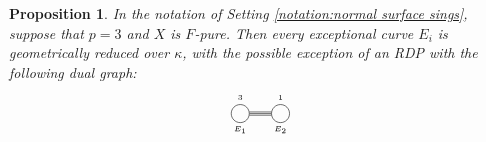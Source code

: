 \documentclass[12pt]{amsart}
\theoremstyle{plain}
\newtheorem{prop}[thm]{Proposition}
\theoremstyle{definition}
\theoremstyle{remark}
\newtheorem{defn and notation}[thm]{Definition and Notation}
\theoremstyle{plain}
\numberwithin{equation}{thm}
\begin{document}
\begin{prop}\label{prop:geom red,p=3,SFP}
    In the notation of Setting \ref{notation:normal surface sings}, suppose that $p=3$ and $X$ is $F$-pure.
    Then every exceptional curve $E_i$ is geometrically reduced over $\kappa$, with the possible exception of an RDP with the following dual graph:
\[
\begin{tikzpicture}
\node[draw, shape=circle, inner sep=4.5pt] (E1) at (3,0){};
\node[draw, shape=circle, inner sep=4.5pt] (E2) at (4,0){};
\draw[shift={(0,0.4)}] (3,0) node{\tiny $3$};
\draw[shift={(0,0.4)}] (4,0) node{\tiny $1$};
\draw[shift={(0,-0.4)}] (3,0) node{\tiny $E_1$};
\draw[shift={(0,-0.4)}] (4,0) node{\tiny $E_2$};

\draw (E1)--(E2);
\draw (E1.10)--(E2.170);
\draw (E1.-10)--(E2.-170);
\end{tikzpicture}
\]
\end{prop}
\end{document}
